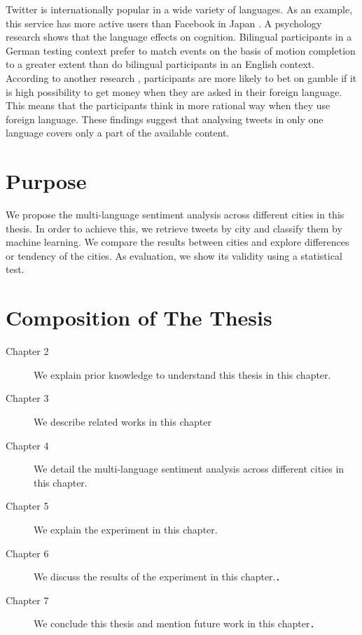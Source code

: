 Twitter is internationally popular in a wide variety of languages.
As an example, this service has more active users than Facebook in Japan \cite{japan_twitter}.
A psychology research \cite{psychology1} shows that the language effects on cognition.
Bilingual participants in a German testing context prefer to match events on the basis of motion completion to a greater extent than do bilingual participants in an English context.
According to another research \cite{psychology2}, participants are more likely to bet on gamble if it is high possibility to get money when they are asked in their foreign language.
This means that the participants think in more rational way when they use foreign language.
These findings suggest that analysing tweets in only one language covers only a part of the available content.

\section{Purpose}
We propose the multi-language sentiment analysis across different cities in this thesis.
In order to achieve this, we retrieve tweets by city and classify them by machine learning. 
We compare the results between cities and explore differences or tendency of the cities. 
As evaluation, we show its validity using a statistical test.

\section{Composition of The Thesis}

\begin{description}
 \item[Chapter 2] We explain prior knowledge to understand this thesis in this chapter.
 \item[Chapter 3] We describe related works in this chapter
 \item[Chapter 4] We detail the multi-language sentiment analysis across different cities in this chapter.
 \item[Chapter 5] We explain the experiment in this chapter.
 \item[Chapter 6] We discuss the results of the experiment in this chapter.．
 \item[Chapter 7] We conclude this thesis and mention future work in this chapter．
\end{description}

